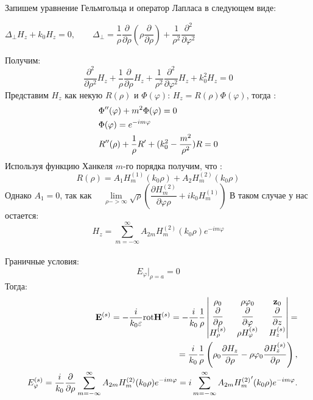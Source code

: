 Запишем уравнение Гельмгольца и оператор Лапласа в следующем виде:
\begin{center}
	$ 
	\Delta_{\perp}H_{z} + k_{0}H_{z} = 0, \qquad
	\Delta_{\perp} = \dfrac{1}{\rho}
	\dfrac{\partial}{\partial \rho} 
	(\rho \dfrac{\partial}{\partial \rho}) + 
	\dfrac{1}{\rho^{2}}
	\dfrac{\partial^{2}}{\partial \varphi^{2}} 
	$
\end{center}
Получим:
\begin{equation}
	\dfrac{\partial^{2}}{\partial \rho^{2}}H_{z}  +
\dfrac{1}{\rho}\dfrac{\partial}{\partial \rho}H_{z} +
\dfrac{1}{\rho^{2}}\dfrac{\partial^{2}}{\partial \varphi^{2}}H_{z}+
k_{0}^{2}H_{z} = 0
\end{equation}
Представим $ H_{z} $ как некую $ R(\rho) $ и $ \Phi(\varphi) $:\quad
$ H_{z} = R(\rho)\Phi(\varphi) $, \qquad тогда :
\begin{align}
&\Phi^{\prime\prime}(\varphi) + m^2\Phi(\varphi) = 0\notag\\ 
&\Phi(\varphi) = e^{-im\varphi}\notag\\
&R^{\prime\prime}(\rho) + \dfrac{1}{\rho} R^{\prime} + (k_{0}^{2} - \dfrac{m^{2}}{\rho^{2}})R = 0
\end{align}
Используя функцию Ханкеля $m$-го порядка получим, что :
\begin{equation}
	R(\rho) = A_{1}H_{m}^{(1)}(k_{0}\rho) + A_{2}H_{m}^{(2)}(k_{0}\rho)
\end{equation}
Однако  $ A_{1} = 0 $, так как
$\quad \lim\limits_{\rho -> \infty}\sqrt{\rho}
(\dfrac{\partial H_{m}^{(2)}}{\partial \varphi \rho} + ik_{0}H_{m}^{(1)} )
$ 
В таком случае у нас остается:
$$
H_{z} = \sum_{m=-\infty}^{\infty}A_{2m}H_{m}^{(2)}(k_{0}\rho)e^{-im\varphi}
$$
\\
Граничные условия:
\begin{equation}
	E_{\varphi}|_{\rho=a} = 0
\end{equation}
Тогда:
\begin{eqnarray}
&&\vec{E}^{(s)} = - \dfrac{i}{k_{0}\varepsilon} {\rm rot}\vec{H}^{(s)} = - \dfrac{i}{k_{0}} \dfrac{1}{\rho}
\begin{vmatrix}
\vec{\rho}_{0}& \;\rho \vec{\varphi}_{0}& \; \vec{z}_{0} \\
\dfrac{\partial }{\partial \rho}& \; 
\dfrac{\partial }{\partial \varphi}&\; 
\dfrac{\partial }{\partial z} \\
H_{\rho}^{(s)}&\; \rho H_{\varphi}^{(s)}&\; H_{z}^{(s)}
\end{vmatrix}
=\notag\\
&& = \dfrac{i}{k_{0}} \dfrac{1}{\rho}\left(\vec{\rho}_{0}
\dfrac{\partial H_{z}}{\partial \rho} - \rho\vec{\varphi}_{0}
\dfrac{\partial H_{z}^{(s)}}{\partial \rho}\right),
\\
&&E_{\varphi}^{(s)} = \dfrac{i}{k_{0}}
\dfrac{\partial }{\partial \rho} \sum_{m=-\infty}^{\infty} A_{2m}H_{m}^{(2)}(k_{0}\rho)e^{-im\varphi} = i\sum_{m=-\infty}^{\infty}A_{2m}{H_{m}^{(2)}}^{\prime}(k_{0}\rho)e^{-im\varphi}.
\end{eqnarray}

